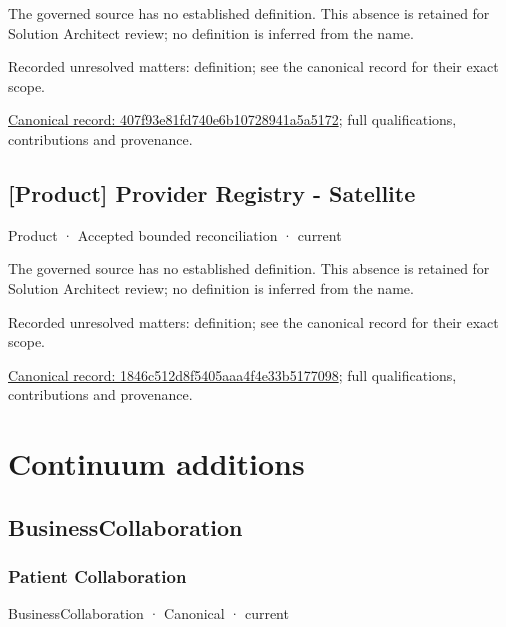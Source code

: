 The governed source has no established definition. This absence is retained for Solution Architect review; no definition is inferred from the name.


{\small Recorded unresolved matters: definition; see the canonical record for their exact scope.}\par
{\footnotesize \href{../../../../continuum/business/product/407f93e81fd740e6b10728941a5a5172.md}{Canonical record: 407f93e81fd740e6b10728941a5a5172}; full qualifications, contributions and provenance.}\par
\section{[Product] Provider Registry - Satellite}

\label{element:1846c512d8f5405aaa4f4e33b5177098}
{\small Product · Accepted bounded reconciliation · current}\par

The governed source has no established definition. This absence is retained for Solution Architect review; no definition is inferred from the name.


{\small Recorded unresolved matters: definition; see the canonical record for their exact scope.}\par
{\footnotesize \href{../../../../continuum/business/product/1846c512d8f5405aaa4f4e33b5177098.md}{Canonical record: 1846c512d8f5405aaa4f4e33b5177098}; full qualifications, contributions and provenance.}\par
\chapter{Continuum additions}

\section{BusinessCollaboration}

\subsection{Patient Collaboration}

\label{element:05cb06fbfc3d4b119f067f5699f67efa}
{\small BusinessCollaboration · Canonical · current}\par

